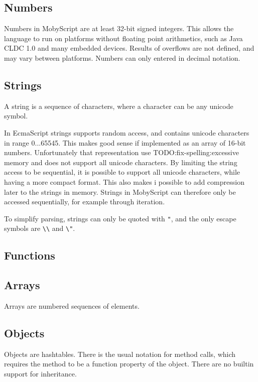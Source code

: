 \subsection{Numbers}

Numbers in MobyScript are at least 32-bit signed integers. 
This allows the language to run on platforms without floating point arithmetics, such as Java CLDC 1.0 and many embedded devices.
Results of overflows are not defined, and may vary between platforms.
Numbers can only entered in decimal notation.

\subsection{Strings}

A string is a sequence of characters, where a character can be any unicode symbol. 


In EcmaScript strings supports random access, and contains unicode characters in range 0...65545.
This makes good sense if implemented as an array of 16-bit numbers. Unfortunately that representation use TODO:fix-spelling:excessive memory and does not support all unicode characters. 
By limiting the string access to be sequential, it is possible to support all unicode characters, while having a more compact format. 
This also makes i possible to add compression later to the strings in memory.
Strings in MobyScript can therefore only be accessed sequentially, for example through iteration.

To simplify parsing, strings can only be quoted with \verb|"|, and the only escape symbols are \verb|\\| and \verb|\"|.

\subsection{Functions}

\subsection{Arrays}

Arrays are numbered sequences of elements.

\subsection{Objects}

Objects are hashtables. 
There is the usual notation for method calls, which requires the method to be a function property of the object.
There are no builtin support for inheritance.


